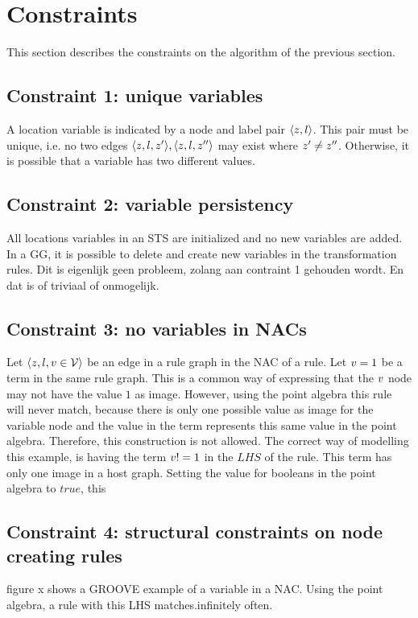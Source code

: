\section{Constraints}

This section describes the constraints on the algorithm of the previous section.

\subsection{Constraint 1: unique variables}
A location variable is indicated by a node and label pair $\langle z, l\rangle$. This pair must be unique, i.e. no two edges $\langle z, l, z'\rangle, \langle z, l, z''\rangle$ may exist where $z' \neq z''$. Otherwise, it is possible that a variable has two different values.

\subsection{Constraint 2: variable persistency}
All locations variables in an STS are initialized and no new variables are added. In a GG, it is possible to delete and create new variables in the transformation rules. 
Dit is eigenlijk geen probleem, zolang aan contraint 1 gehouden wordt. En dat is of triviaal of onmogelijk.

\subsection{Constraint 3: no variables in NACs}
Let $\langle z, l, v \in \mathcal{V}\rangle$ be an edge in a rule graph in the NAC of a rule. Let $v = 1$ be a term in the same rule graph. This is a common way of expressing that the $v$ node may not have the value $1$ as image. However, using the point algebra this rule will never match, because there is only one possible value as image for the variable node and the value in the term represents this same value in the point algebra. Therefore, this construction is not allowed. The correct way of modelling this example, is having the term $v != 1$ in the $\mathit{LHS}$ of the rule. This term has only one image in a host graph. Setting the value for booleans in the point algebra to $true$, this 

\subsection{Constraint 4: structural constraints on node creating rules}
figure x shows a GROOVE example of a variable in a NAC. Using the point algebra, a rule with this LHS matches.infinitely often.
